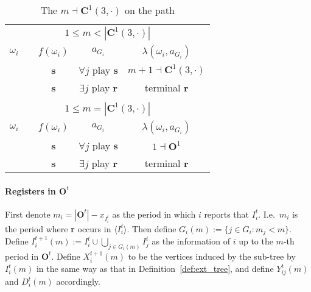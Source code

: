 \documentclass[12pt,letter]{article}
\newcommand{\Kappa}{\mathbf{C}}
\newcommand{\Omicron}{\mathbf{O}}
\theoremstyle{definition}
\theoremstyle{remark}
\theoremstyle{claim}
\begin{document}
\begin{table}[!htbp]
\caption{The $m\dashv\Kappa^1(3,\cdot)$ on the path}
\label{table:eqm_path_k03}
\begin{center}
\begin{tabular}{c c | c | c | c}
\multicolumn{5}{c}{$1\leq m < |\Kappa^1(3,\cdot)|$}\\
$\omega_i$ 	 & 	   &	$f(\omega_i)$  &	$a_{G_i}$ & $\lambda(\omega_i,a_{G_i})$ \\
\hline
\hline
  	&	& \textbf{s} & $\forall j$ play $\textbf{s}$ 	& $m+1\dashv \Kappa^1(3,\cdot)$\\
  	&  & \textbf{s}  &  $\exists j$ play $\textbf{r}$  	& terminal \textbf{r}\\
\hline
\\
\multicolumn{5}{c}{$1\leq m = |\Kappa^1(3,\cdot)|$}\\
$\omega_i$ 	 & 	   &	$f(\omega_i)$  &	$a_{G_i}$ & $\lambda(\omega_i,a_{G_i})$ \\
\hline
\hline
  	& 	& \textbf{s} & $\forall j$ play $\textbf{s}$ 	& $1\dashv \Omicron^1$\\
  	&  & \textbf{s}  &  $\exists j$ play $\textbf{r}$  	& terminal \textbf{r}\\
\hline
\end{tabular}
\end{center}
\end{table}



\clearpage

\paragraph{Registers in $\Omicron^t$}
First denote $m_i=|\Omicron^t|-x_{I^t_i}$ as the period in which $i$ reports that $I^t_i$. I.e.~$m_i$ is the period where \textbf{r} occurs in $\langle I^t_i \rangle$. 
Then define $G_i(m):=\{j\in G_i: m_j<m\}$. Define $I^{t+1}_i(m):= I^t_i\cup\bigcup_{j\in G_i(m)}I^t_j$ as the information of $i$ up to the $m$-th period in $\Omicron^t$. 
Define $X^{t+1}_i(m)$ to be the vertices induced by the sub-tree by $I^t_i(m)$ in the same way as that in Definition~\ref{def:ext_tree}, and define $Y^t_{ij}(m)$ and $D^t_i(m)$ accordingly.
\end{document}
